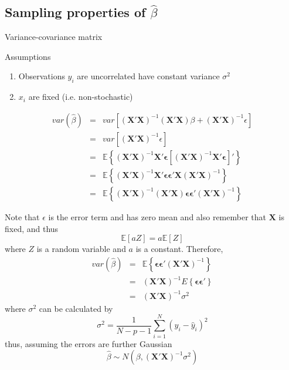 \documentclass{beamer}
\newcommand{\E}{\mathbb{E}}
\begin{document}
\subsection{Sampling properties of $\hat{\beta}$}
\begin{frame}{Variance-covariance matrix}
\begin{block}{Assumptions}
\begin{enumerate}
\item{} Observations $y_i$ are uncorrelated have constant variance $\sigma^2$
\item{} $x_i$ are fixed (i.e. non-stochastic)
\end{enumerate}
\end{block}
\begin{eqnarray*}
var(\hat{\beta})&=&var\left[(\bm{X}'\bm{X})^{-1}(\bm{X}'\bm{X})\beta+(\bm{X}'\bm{X})^{-1}\epsilon\right]\\
&=&var\left[(\bm{X}'\bm{X})^{-1}\epsilon\right]\\
&=&\E\left\{(\bm{X}'\bm{X})^{-1}\bm{X}'\bm{\epsilon}[(\bm{X}'\bm{X})^{-1}\bm{X}'\bm{\epsilon}]'\right\}\\
&=&\E\left\{(\bm{X}'\bm{X})^{-1}\bm{X}'\bm{\epsilon}\bm{\epsilon}'\bm{X}(\bm{X}'\bm{X})^{-1}\right\}\\
&=&\E\left\{(\bm{X}'\bm{X})^{-1}(\bm{X}'\bm{X})\bm{\epsilon}\bm{\epsilon}'(\bm{X}'\bm{X})^{-1}\right\}
\end{eqnarray*}
\end{frame}

\begin{frame}
Note that $\epsilon$ is the error term and has zero mean and also remember that $\bm{X}$ is fixed, and thus 
\[
\E[aZ]=a\E[Z]
\]
where $Z$ is a random variable and $a$ is a constant. Therefore, 
\begin{eqnarray*}
var(\hat{\beta})&=&\E\left\{\bm{\epsilon}\bm{\epsilon}'(\bm{X}'\bm{X})^{-1}\right\}\\
&=&(\bm{X}'\bm{X})^{-1}E\left\{\bm{\epsilon}\bm{\epsilon}'\right\}\\
&=&(\bm{X}'\bm{X})^{-1}\sigma^2
\end{eqnarray*}
where $\sigma^2$ can be calculated by
\[
\sigma^2=\frac{1}{N-p-1}\sum\limits_{i=1}^N(y_i-\hat{y}_i)^2
\]
thus, assuming the errors are further Gaussian
\[
\hat{\beta}\sim N(\beta,(\bm{X}'\bm{X})^{-1}\sigma^2)
\]
\end{frame}
\end{document}
